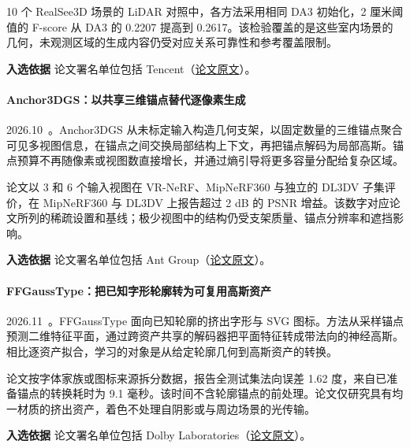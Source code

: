 10 个 RealSee3D 场景的 LiDAR 对照中，各方法采用相同 DA3 初始化，2 厘米阈值的 F-score 从 DA3 的 0.2207 提高到 0.2617。该检验覆盖的是这些室内场景的几何，未观测区域的生成内容仍受对应关系可靠性和参考覆盖限制。

\textbf{入选依据} 论文署名单位包括 Tencent（\href{https://arxiv.org/html/2610.19502v1}{论文原文}）。

\paragraph{Anchor3DGS：以共享三维锚点替代逐像素生成}
2026.10~\cite{2610_21634}。Anchor3DGS 从未标定输入构造几何支架，以固定数量的三维锚点聚合可见多视图信息，在锚点之间交换局部结构上下文，再把锚点解码为局部高斯。锚点预算不再随像素或视图数直接增长，并通过熵引导将更多容量分配给复杂区域。

论文以 3 和 6 个输入视图在 VR-NeRF、MipNeRF360 与独立的 DL3DV 子集评价，在 MipNeRF360 与 DL3DV 上报告超过 2 dB 的 PSNR 增益。该数字对应论文所列的稀疏设置和基线；极少视图中的结构仍受支架质量、锚点分辨率和遮挡影响。

\textbf{入选依据} 论文署名单位包括 Ant Group（\href{https://arxiv.org/abs/2610.21634}{论文原文}）。

\paragraph{FFGaussType：把已知字形轮廓转为可复用高斯资产}
2026.11~\cite{2611_26431}。FFGaussType 面向已知轮廓的挤出字形与 SVG 图标。方法从采样锚点预测二维特征平面，通过跨资产共享的解码器把平面特征转成带法向的神经高斯。相比逐资产拟合，学习的对象是从给定轮廓几何到高斯资产的转换。

论文按字体家族或图标来源拆分数据，报告全测试集法向误差 1.62 度，来自已准备锚点的转换耗时为 9.1 毫秒。该时间不含轮廓锚点的前处理。论文仅研究具有均一材质的挤出资产，着色不处理自阴影或与周边场景的光传输。

\textbf{入选依据} 论文署名单位包括 Dolby Laboratories（\href{https://arxiv.org/abs/2611.26431}{论文原文}）。
